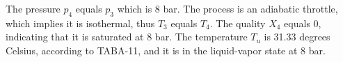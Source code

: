The pressure \( p_4 \) equals \( p_3 \) which is 8 bar. The process is an adiabatic throttle, which implies it is isothermal, thus \( T_3 \) equals \( T_4 \). The quality \( X_4 \) equals 0, indicating that it is saturated at 8 bar. The temperature \( T_u \) is 31.33 degrees Celsius, according to TABA-11, and it is in the liquid-vapor state at 8 bar.